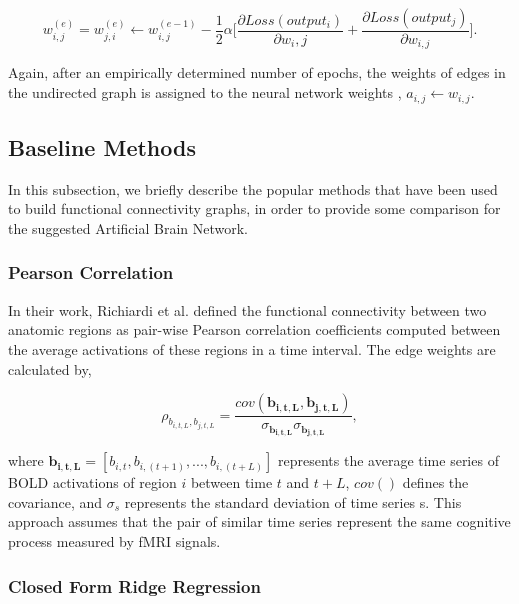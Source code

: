 \documentclass[runningheads]{llncs}
\begin{document}
\begin{equation}
w_{i,j}^{(e)} = w_{j,i}^{(e)} \leftarrow w_{i,j}^{(e-1)} - \frac{1}{2}  \alpha \bigg[ \frac{\partial Loss(output_i)}{\partial {w_i,j}}  + \frac{\partial Loss(output_j)}{\partial w_{i,j} } \bigg]     
\label{eq:bidirUpdate} .
\end{equation}

Again, after an empirically determined number of epochs, the weights of edges in the undirected graph is assigned to the neural network weights , $a_{i,j} \gets w_{i,j}$.

\subsection{Baseline Methods}

In this subsection, we briefly describe the popular methods that have been used to build functional connectivity graphs, in order to provide some comparison for the suggested Artificial Brain Network.

\subsubsection{Pearson Correlation}

In their work, Richiardi et al. \cite{richiardi2011decoding} defined the functional connectivity between two anatomic regions as pair-wise Pearson correlation coefficients computed between the average activations of these regions in a time interval. The edge weights are calculated by,

\begin{equation}
\rho_{b_{i,t,L}, b_{j,t,L}} = \frac{cov(\mathbf{b_{i,t,L}}, \mathbf{b_{j,t,L}})}{\sigma_{\mathbf{b_{i,t,L}} } \sigma_{\mathbf{ b_{j,t,L}} }  } ,
\end{equation}

where $\mathbf{b_{i,t,L}} = [b_{i,t}, b_{i,(t+1)}, ... , b_{i,(t+L)}]$ represents the average time series of BOLD activations of region $i$ between time $t$ and $t+L$, $cov()$ defines the covariance, and $\sigma_{s}$ represents the standard deviation of time series s. This approach assumes that the pair of similar time series represent the same cognitive process measured by fMRI signals.

\subsubsection{Closed Form Ridge Regression}
\end{document}
